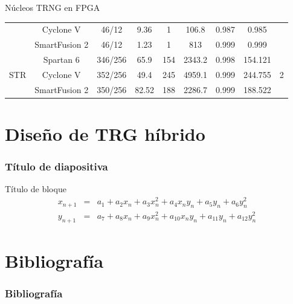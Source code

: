 \documentclass[10pt]{beamer}
\begin{document}
\begin{frame}
\begin{block}{Núcleos TRNG en FPGA}
\begin{table}[htbp]
{\begin{tabular}{|c|c|c|c|c|c|c|c|c|}
                  & Cyclone V & 46/12 & 9.36  & 1     & 106.8 & 0.987 & 0.985 &  \\
                  & SmartFusion 2 & 46/12 & 1.23  & 1     & 813   & 0.999 & 0.999 &  \\
            \hline
            \multirow{3}[2]{*}{STR} & Spartan 6 & 346/256 & 65.9  & 154   & 2343.2 & 0.998 & 154.121 & \multirow{3}[2]{*}{2} \\
                  & Cyclone V & 352/256 & 49.4  & 245   & 4959.1 & 0.999 & 244.755 &  \\
                  & SmartFusion 2 & 350/256 & 82.52 & 188   & 2286.7 & 0.999 & 188.522 &  \\
            \hline
        \end{tabular}%
    }
  \label{tab:resumen_de_trng_cores}
\end{table}%
   
	\end{block}
\end{frame}


\section{Diseño de TRG híbrido}
\begin{frame}
    \frametitle{Título de diapositiva}
    \begin{block}{Título de bloque}
        \justifying
        \begin{equation}
        \begin{array}{ccl}
		    x_{n+1} & = &  a_{1} + a_{2}x_{n} + a_{3}x_{n}^{2} + a_{4}x_{n}y_{n} + a_{5}y_{n} + a_{6}y_{n}^{2}\\
		    y_{n+1} & = &  a_{7} + a_{8}x_{n} + a_{9}x_{n}^{2} + a_{10}x_{n}y_{n} + a_{11}y_{n} + a_{12}y_{n}^{2}
		\end{array}
	    \end{equation}
	\end{block}
\end{frame}


\section{Bibliografía}
\begin{frame}
    \frametitle{Bibliografía}
	
	
\end{frame}
\end{document}
